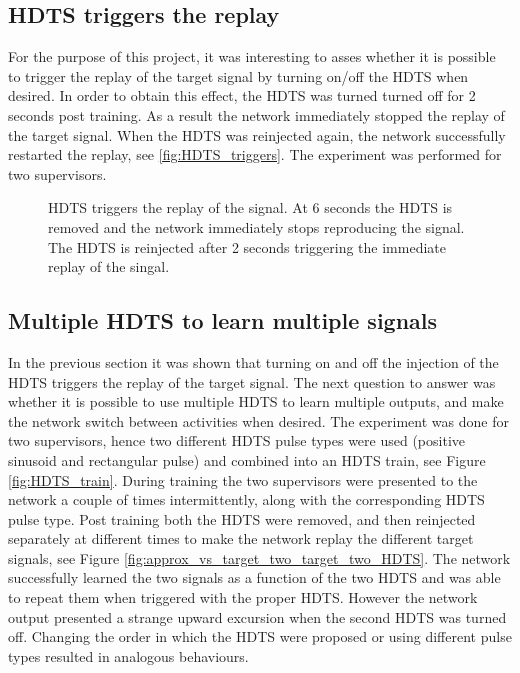 \documentclass[10pt,a4paper, final]{report} %
\begin{document}
\subsection{HDTS triggers the replay}
For the purpose of this project, it was interesting to asses whether it is possible to trigger the replay of the target signal by turning on/off the HDTS when desired. In order to obtain this effect, the HDTS was turned turned off for 2 seconds post training. As a result the network immediately stopped the replay of the target signal. When the HDTS was reinjected again, the network successfully restarted the replay, see \autoref{fig:HDTS_triggers}. The experiment was performed for two supervisors.

\begin{figure}[H]
\centering
{}
\caption{HDTS triggers the replay of the signal. At 6 seconds the HDTS is removed and the network immediately stops reproducing the signal. The HDTS is reinjected after 2 seconds triggering the immediate replay of the singal.}
\label{fig:HDTS_triggers}
\end{figure}

\subsection{Multiple HDTS to learn multiple signals}
In the previous section it was shown that turning on and off the injection of the HDTS triggers the replay of the target signal. The next question to answer was whether it is possible to use multiple HDTS to learn multiple outputs, and make the network switch between activities when desired. The experiment was done for two supervisors, hence two different HDTS pulse types were used (positive sinusoid and rectangular pulse) and combined into an HDTS train, see Figure \autoref{fig:HDTS_train}. During training the two supervisors were presented to the network a couple of times intermittently, along with the corresponding HDTS pulse type. Post training both the HDTS were removed, and then reinjected separately at different times to make the network replay the different target signals, see Figure \autoref{fig:approx_vs_target_two_target_two_HDTS}. The network successfully learned the two signals as a function of the two HDTS and was able to repeat them when triggered with the proper HDTS. However the network output presented a strange upward excursion when the second HDTS was turned off. Changing the order in which the HDTS were proposed or using different pulse types resulted in analogous behaviours.
\end{document}
